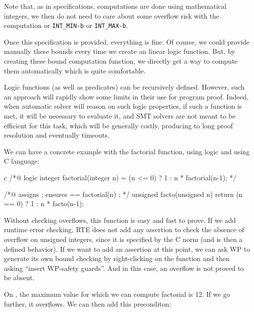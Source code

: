 \begin{Information}
  Note that, as in specifications, computations are done using mathematical
  integers, we then do not need to care about some overflow risk with the
  computation or \texttt{INT\_MIN-b} or \texttt{INT\_MAX-b}.
\end{Information}


Once this specification is provided, everything is fine. Of course, we
could provide manually these bounds every time we create an linear logic
function. But, by creating these bound computation function, we directly
get a way to compute them automatically which is quite comfortable.





Logic functions (as well as predicates) can be recursively defined.
However, such an approach will rapidly show some limits in their use for
program proof. Indeed, when automatic solver will reason on such logic
properties, if such a function is met, it will be necessary to evaluate
it, and SMT solvers are not meant to be efficient for this task, which
will be generally costly, producing to long proof resolution and
eventually timeouts.

We can have a concrete example with the factorial function, using logic
and using C language:



\begin{CodeBlock}{c}
/*@
  logic integer factorial(integer n) = (n <= 0) ? 1 : n * factorial(n-1);
*/

/*@ 
  assigns \nothing ;
  ensures \result == factorial(n) ; 
*/
unsigned facto(unsigned n){
  return (n == 0) ? 1 : n * facto(n-1);
}
\end{CodeBlock}



Without checking overflows, this function is easy and fast to prove. If
we add runtime error checking, RTE does not add any assertion to check
the absence of overflow on unsigned integers, since it is specified by
the C norm (and is then a defined behavior). If we want to add an
assertion at this point, we can ask WP to generate its own bound
checking by right-clicking on the function and then asking ``insert
WP-safety guards''. And in this case, an overflow is not proved to be
absent.



On , the maximum value for which we can compute
factorial is 12. If we go further, it overflows. We can then add this
preconditon:



